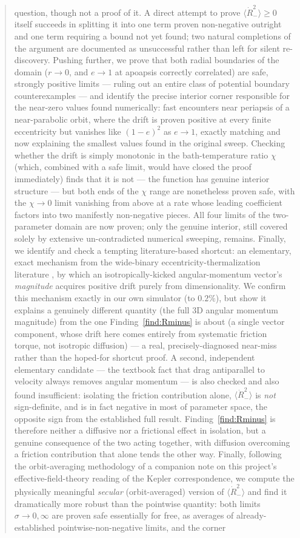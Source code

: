 \documentclass[12pt]{amsart}
\theoremstyle{plain}
\theoremstyle{remark}
\begin{document}
\begin{abstract}
question, though not a proof of it. A direct attempt to prove $\langle\dot R_-^2\rangle\geq0$ itself succeeds in splitting it into one term proven non-negative outright and one term requiring a bound not yet found; two natural completions of the argument are documented as unsuccessful rather than left for silent re-discovery. Pushing further, we prove that both radial boundaries of the domain ($r\to0$, and $e\to1$ at apoapsis correctly correlated) are safe, strongly positive limits --- ruling out an entire class of potential boundary counterexamples --- and identify the precise interior corner responsible for the near-zero values found numerically: fast encounters near periapsis of a near-parabolic orbit, where the drift is proven positive at every finite eccentricity but vanishes like $(1-e)^2$ as $e\to1$, exactly matching and now explaining the smallest values found in the original sweep. Checking whether the drift is simply monotonic in the bath-temperature ratio $\chi$ (which, combined with a safe limit, would have closed the proof immediately) finds that it is not --- the function has genuine interior structure --- but both ends of the $\chi$ range are nonetheless proven safe, with the $\chi\to0$ limit vanishing from above at a rate whose leading coefficient factors into two manifestly non-negative pieces. All four limits of the two-parameter domain are now proven; only the genuine interior, still covered solely by extensive un-contradicted numerical sweeping, remains. Finally, we identify and check a tempting literature-based shortcut: an elementary, exact mechanism from the wide-binary eccentricity-thermalization literature \cite{HamiltonModak2024}, by which an isotropically-kicked angular-momentum vector's \emph{magnitude} acquires positive drift purely from dimensionality. We confirm this mechanism exactly in our own simulator (to $0.2\%$), but show it explains a genuinely different quantity (the full 3D angular momentum magnitude) from the one Finding~\ref{find:Rminus} is about (a single vector component, whose drift here comes entirely from systematic friction torque, not isotropic diffusion) --- a real, precisely-diagnosed near-miss rather than the hoped-for shortcut proof. A second, independent elementary candidate --- the textbook fact that drag antiparallel to velocity always removes angular momentum --- is also checked and also found insufficient: isolating the friction contribution alone, $\langle\dot R_-^2\rangle$ is \emph{not} sign-definite, and is in fact negative in most of parameter space, the opposite sign from the established full result. Finding~\ref{find:Rminus} is therefore neither a diffusive nor a frictional effect in isolation, but a genuine consequence of the two acting together, with diffusion overcoming a friction contribution that alone tends the other way. Finally, following the orbit-averaging methodology of a companion note on this project's effective-field-theory reading of the Kepler correspondence, we compute the physically meaningful \emph{secular} (orbit-averaged) version of $\langle\dot R_-^2\rangle$ and find it dramatically more robust than the pointwise quantity: both limits $\sigma\to0,\infty$ are proven safe essentially for free, as averages of already-established pointwise-non-negative limits, and the corner 
\end{abstract}
\end{document}
